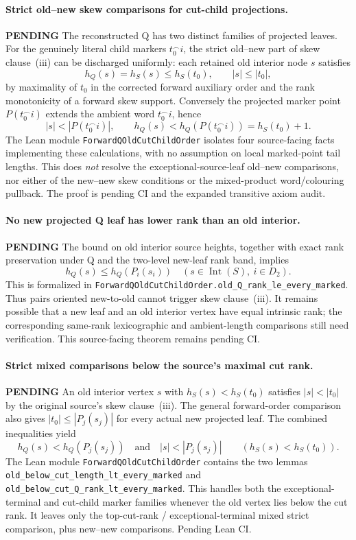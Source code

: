 \documentclass[11pt]{article}
\newcommand{\todo}{\textcolor{gray!70!black}{\textbf{PENDING}}}
\newcommand{\lean}[1]{\texttt{#1}}
\begin{document}
\paragraph{Strict old--new skew comparisons for cut-child projections.} \todo
The reconstructed Q has two distinct families of projected leaves.
For the genuinely literal child markers $t_0^\frown i$, the strict
old--new part of skew clause~(iii) can be discharged uniformly:
each retained old interior node $s$ satisfies
\[
h_Q(s)=h_S(s)\le h_S(t_0),\qquad |s|\le |t_0|,
\]
by maximality of $t_0$ in the corrected forward auxiliary order
and the rank monotonicity of a forward skew support. Conversely
the projected marker point $P(t_0^\frown i)$ extends the ambient
word $t_0^\frown i$, hence
\[
|s|<|P(t_0^\frown i)|,\qquad
h_Q(s)<h_Q(P(t_0^\frown i))=h_S(t_0)+1.
\]
The Lean module \lean{ForwardQOldCutChildOrder} isolates four
source-facing facts implementing these calculations, with no
assumption on local marked-point tail lengths.
This does \emph{not} resolve the exceptional-source-leaf
old--new comparisons, nor either of the new--new skew
conditions or the mixed-product word/colouring pullback.
The proof is pending CI and the expanded transitive axiom audit.


\paragraph{No new projected Q leaf has lower rank than an old interior.} \todo
The bound on old interior source heights, together with exact
rank preservation under Q and the two-level new-leaf rank band,
implies
\[
 h_Q(s)\le h_Q(P_i(s_i))
 \quad
 (s\in\operatorname{Int}(S),\ i\in D_2).
\]
This is formalized in
\lean{ForwardQOldCutChildOrder.old\_Q\_rank\_le\_every\_marked}.
Thus pairs oriented new-to-old cannot trigger skew clause~(iii).
It remains possible that a new leaf and an old interior vertex
have equal intrinsic rank; the corresponding same-rank lexicographic
and ambient-length comparisons still need verification.
This source-facing theorem remains pending CI.


\paragraph{Strict mixed comparisons below the source's maximal cut rank.} \todo
An old interior vertex $s$ with $h_S(s)<h_S(t_0)$ satisfies
$|s|<|t_0|$ by the original source's skew clause~(iii).
The general forward-order comparison also gives
$|t_0|\le |P_j(s_j)|$ for every actual new projected
leaf. The combined inequalities yield
\[
 h_Q(s)<h_Q(P_j(s_j))
 \quad\text{and}\quad
 |s|<|P_j(s_j)|
 \qquad(h_S(s)<h_S(t_0)).
\]
The Lean module \lean{ForwardQOldCutChildOrder} contains the two
lemmas \lean{old\_below\_cut\_length\_lt\_every\_marked}
and \lean{old\_below\_cut\_Q\_rank\_lt\_every\_marked}.
This handles both the exceptional-terminal and cut-child marker
families whenever the old vertex lies below the cut rank.
It leaves only the top-cut-rank / exceptional-terminal mixed
strict comparison, plus new--new comparisons. Pending Lean CI.
\end{document}
